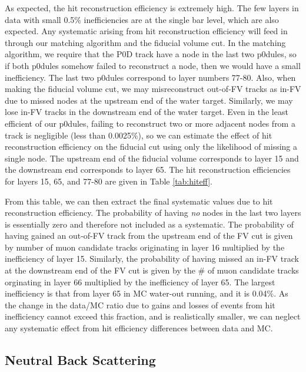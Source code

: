 As expected, the hit reconstruction efficiency is extremely high. The few layers in data with small 0.5\% inefficiencies are at the single bar level, which are also expected. Any systematic arising from hit reconstruction efficiency will feed in through our matching algorithm and the fiducial volume cut. In the matching algorithm, we require that the P0D track have a node in the last two p0dules, so if both p0dules somehow failed to reconstruct a node, then we would have a small inefficiency. The last two p0dules correspond to layer numbers 77-80. Also, when making the fiducial volume cut, we may misreconstruct out-of-FV tracks as in-FV due to missed nodes at the upstream end of the water target. Similarly, we may lose in-FV tracks in the downstream end of the water target. Even in the least efficient of our p0dules, failing to reconstruct two or more adjacent nodes from a track is negligible (less than 0.0025\%), so we can estimate the effect of hit reconstruction efficiency on the fiducial cut using only the likelihood of missing a single node. The upstream end of the fiducial volume corresponds to layer 15 and the downstream end corresponds to layer 65. The hit reconstruction efficiencies for layers 15, 65, and 77-80 are given in Table \ref{tab:hiteff}.

From this table, we can then extract the final systematic values due to hit reconstruction efficiency. The probability of having \emph{no} nodes in the last two layers is essentially zero and therefore not included as a systematic. The probability of having gained an out-of-FV track from the upstream end of the FV cut is given by number of muon candidate tracks originating in layer 16 multiplied by the inefficiency of layer 15. Similarly, the probability of having missed an in-FV track at the downstream end of the FV cut is given by the \# of muon candidate tracks orginating in layer 66 multiplied by the inefficiency of layer 65. The largest inefficiency is that from layer 65 in MC water-out running, and it is 0.04$\%$. As the change in the data/MC ratio due to gains and losses of events from hit inefficiency cannot exceed this fraction, and is realistically smaller, we can neglect any systematic effect from hit efficiency differences between data and MC.

\subsection{Neutral Back Scattering}


